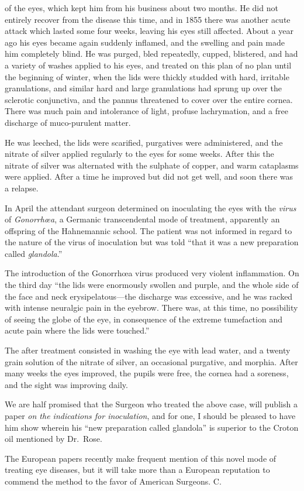  of the eyes, which kept him from his business about two months.
He did not entirely recover from the disease this time, and in 1855
there was another acute attack which lasted some four weeks, leaving
his eyes still affected. About a year ago his eyes became again suddenly
inflamed, and the swelling and pain made him completely blind.
He was purged, bled repeatedly, cupped, blistered, and had a variety of
washes applied to his eyes, and treated on this plan of no plan until the
beginning of winter, when the lids were thickly studded with hard, irritable
granulations, and similar hard and large granulations had sprung
up over the sclerotic conjunctiva, and the pannus threatened to cover over
the entire cornea. There was much pain and intolerance of light, profuse
lachrymation, and a free discharge of muco-purulent matter.

He was leeched, the lids were scarified, purgatives were administered,
and the nitrate of silver applied regularly to the eyes for some weeks.
After this the nitrate of silver was alternated with the sulphate of copper,
and warm cataplasms were applied. After a time he improved
but did not get well, and soon there was a relapse.

In April the attendant surgeon determined on inoculating the eyes
with the \emph{virus} of \emph{Gonorrhœa}, a Germanic transcendental mode of
treatment, apparently an offspring of the Hahnemannic school. The patient
was not informed in regard to the nature of the virus of inoculation
but was told ``that it was a new preparation called \emph{glandola}.''

The introduction of the Gonorrhœa virus produced very violent inflammation.
On the third day ``the lids were enormously swollen and
purple, and the whole side of the face and neck erysipelatous---the discharge
was excessive, and he was racked with intense neuralgic pain in
the eyebrow. There was, at this time, no possibility of seeing the globe of
the eye, in consequence of the extreme tumefaction and acute pain
where the lids were touched.''

The after treatment consisted in washing the eye with lead water, and
a twenty grain solution of the nitrate of silver, an occasional purgative,
and morphia. After many weeks the eyes improved, the pupils were
free, the cornea had a soreness, and the sight was improving daily.

We are half promised that the Surgeon who treated the above case,
will publish a paper \emph{on the indications for inoculation}, and for one,
I should be pleased to have him show wherein his ``new preparation
called glandola'' is superior to the Croton oil mentioned by Dr.\ Rose.

The European papers recently make frequent mention of this novel
mode of treating eye diseases, but it will take more than a European
reputation to commend the method to the favor of American Surgeons. \hfill{}C.

\endinput
